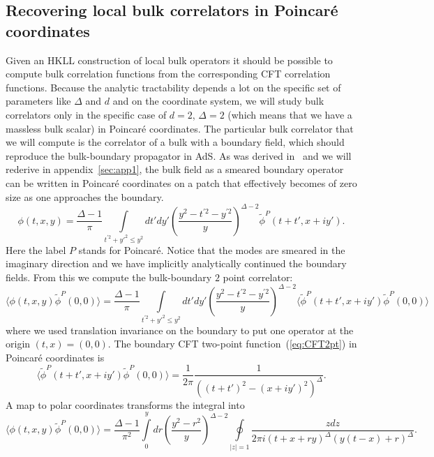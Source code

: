 \documentclass{PoS}
\newcommand{\LF}{\left(}
\newcommand{\RF}{\right)}
\begin{document}
\subsection{Recovering local bulk correlators in Poincar\'e coordinates}
Given an HKLL construction of local bulk operators it should be possible to compute bulk correlation functions from the corresponding CFT correlation functions. Because the analytic tractability depends a lot on the specific set of parameters like $\Delta$ and $d$ and on the coordinate system, we will study bulk correlators only in the specific case of $d=2$, $\Delta=2$ (which means that we have a massless bulk scalar) in Poincar\'e coordinates. The particular bulk correlator that we will compute is the correlator of a bulk with a boundary field, which should reproduce the bulk-boundary propagator in AdS. As was derived in~\cite{Hamilton:2006fh,Hamilton:2006az} and we will rederive in appendix~\ref{sec:app1}, the bulk field as a smeared boundary operator can be written in Poincar\'e coordinates on a patch that effectively becomes of zero size as one approaches the boundary.
\begin{equation}
\phi(t,x,y) = \frac{\Delta-1}{\pi} \int\limits_{t^{'2}+y'^{2}\leq y^2} dt' dy' \LF \frac{y^2 -t^{'2} - y^{'2}}{y}\RF^{\Delta-2} \tilde{\phi}^P (t+t',x+iy').
\end{equation}
Here the label $P$ stands for Poincar\'e. Notice that the modes are smeared in the imaginary direction and we have implicitly analytically continued the boundary fields. From this we compute the bulk-boundary $2$ point correlator:
\begin{equation}
\langle \phi(t,x,y) \tilde{\phi}^P(0,0)\rangle = \frac{\Delta-1}{\pi} \int\limits_{t^{'2}+y'^{2}\leq y^2} dt' dy' \LF \frac{y^2 -t^{'2} - y^{'2}}{y}\RF^{\Delta-2} \langle\tilde{\phi}^P (t+t',x+iy')\tilde{\phi}^P(0,0)\rangle
\end{equation}
where we used translation invariance on the boundary to put one operator at the origin $(t,x)=(0,0)$. The boundary CFT two-point function~(\ref{eq:CFT2pt}) in Poincar\'e coordinates is
\begin{equation}
\langle\tilde{\phi}^P (t+t',x+iy')\tilde{\phi}^P(0,0)\rangle =  \frac{1}{2\pi} \frac{ 1}{ \LF (t+t')^2 - (x+iy')^2\RF^\Delta}.
\end{equation}
A map to polar coordinates transforms the integral into
\begin{equation}
\langle \phi(t,x,y) \tilde{\phi}^P(0,0)\rangle = \frac{\Delta -1}{\pi^2} \int\limits_{0}^y dr \LF \frac{y^2-r^2}{y}\RF^{\Delta- 2} \oint\limits_{\left|z\right|=1} \frac{ z dz}{ 2\pi i \LF t+x+ry\RF^\Delta \LF y(t-x)+r\RF^\Delta}.
\end{equation}
\end{document}
